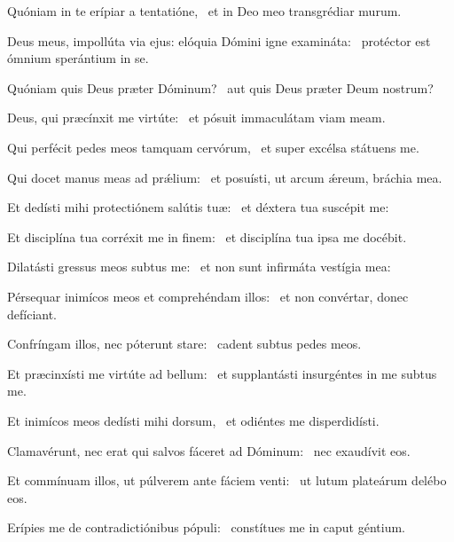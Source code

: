 \item Quóniam in te erípiar a tentatióne,~\psstar{} et in Deo meo transgrédiar murum.

\item Deus meus, impollúta via ejus: elóquia Dómini igne examináta:~\psstar{} protéctor est ómnium sperántium in se.

\item Quóniam quis Deus præter Dóminum?~\psstar{} aut quis Deus præter Deum nostrum?

\item Deus, qui præcínxit me virtúte:~\psstar{} et pósuit immaculátam viam meam.

\item Qui perfécit pedes meos tamquam cervórum,~\psstar{} et super excélsa státuens me.

\item Qui docet manus meas ad prǽlium:~\psstar{} et posuísti, ut arcum ǽreum, bráchia mea.

\item Et dedísti mihi protectiónem salútis tuæ:~\psstar{} et déxtera tua suscépit me:

\item Et disciplína tua corréxit me in finem:~\psstar{} et disciplína tua ipsa me docébit.

\item Dilatásti gressus meos subtus me:~\psstar{} et non sunt infirmáta vestígia mea:

\item Pérsequar inimícos meos et comprehéndam illos:~\psstar{} et non convértar, donec defíciant.

\item Confríngam illos, nec póterunt stare:~\psstar{} cadent subtus pedes meos.

\item Et præcinxísti me virtúte ad bellum:~\psstar{} et supplantásti insurgéntes in me subtus me.

\item Et inimícos meos dedísti mihi dorsum,~\psstar{} et odiéntes me disperdidísti.

\item Clamavérunt, nec erat qui salvos fáceret ad Dóminum:~\psstar{} nec exaudívit eos.

\item Et commínuam illos, ut púlverem ante fáciem venti:~\psstar{} ut lutum plateárum delébo eos.

\item Erípies me de contradictiónibus pópuli:~\psstar{} constítues me in caput géntium.

